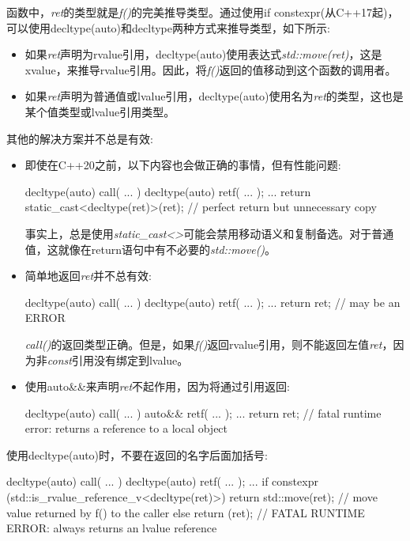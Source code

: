 函数中，\textit{ret}的类型就是\textit{f()}的完美推导类型。通过使用if constexpr(从C++17起)，可以使用decltype(auto)和decltype两种方式来推导类型，如下所示:

\begin{itemize}
	\item 如果\textit{ret}声明为rvalue引用，decltype(auto)使用表达式\textit{std::move(ret)}，这是xvalue，来推导rvalue引用。因此，将\textit{f()}返回的值移动到这个函数的调用者。
	\item 如果\textit{ret}声明为普通值或lvalue引用，decltype(auto)使用名为\textit{ret}的类型，这也是某个值类型或lvalue引用类型。
\end{itemize}

其他的解决方案并不总是有效:

\begin{itemize}
	\item 即使在C++20之前，以下内容也会做正确的事情，但有性能问题:

\begin{cppcode}
decltype(auto) call( ... )
{
	decltype(auto) ret{f( ... )};
	...
	return static_cast<decltype(ret)>(ret); // perfect return but unnecessary copy
}
\end{cppcode}
事实上，总是使用\textit{static_cast<>}可能会禁用移动语义和复制备选。对于普通值，这就像在return语句中有不必要的\textit{std::move()}。
\item 简单地返回\textit{ret}并不总有效:
\begin{cppcode}
decltype(auto) call( ... )
{
	decltype(auto) ret{f( ... )};
	...
	return ret; // may be an ERROR
}
\end{cppcode}
\textit{call()}的返回类型正确。但是，如果\textit{f()}返回rvalue引用，则不能返回左值\textit{ret}，因为非\textit{const}引用没有绑定到lvalue。
\item 使用auto\&\&来声明\textit{ret}不起作用，因为将通过引用返回:
\begin{cppcode}
decltype(auto) call( ... )
{
	auto&& ret{f( ... )};
	...
	return ret; // fatal runtime error: returns a reference to a local object
}
\end{cppcode}
\end{itemize}

使用decltype(auto)时，不要在返回的名字后面加括号:

\begin{cppcode}
decltype(auto) call( ... )
{
	decltype(auto) ret{f( ... )};
	...
	if constexpr (std::is_rvalue_reference_v<decltype(ret)>) {
		return std::move(ret); // move value returned by f() to the caller
	}
	else {
		return (ret); // FATAL RUNTIME ERROR: always returns an lvalue reference
	}
}
\end{cppcode}

